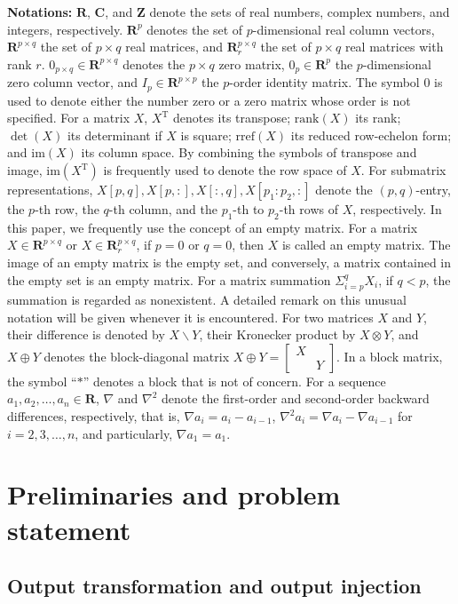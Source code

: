 \documentclass[sort&compress]{elsarticle}
\newcommand\rank{\mathrm{rank}}
\newcommand\rref{\mathrm{rref}}
\newcommand\im{\mathrm{im}}
\newcommand\imr[1]{\mathrm{im}(#1^\mathrm T)}
\newcommand\R{\mathbf R}
\newcommand\T{\mathrm T}
\begin{document}
\textbf{Notations:}
$\R$, $\mathbf C$, and $\mathbf Z$ denote the sets of real numbers,
complex numbers, and integers, respectively.
$\R^p$ denotes the set of $p$-dimensional real column vectors,
$\R^{p\times q}$ the set of $p\times q$ real matrices, and
$\R^{p\times q}_r$ the set of $p\times q$ real matrices with rank $r$.
$0_{p\times q}\in\R^{p\times q}$ denotes the $p\times q$ zero matrix,
$0_p\in\R^p$ the $p$-dimensional zero column vector, and
$I_p\in\R^{p\times p}$ the $p$-order identity matrix.
The symbol $0$ is used to denote either the number zero or
a zero matrix whose order is not specified.
For a matrix $X$,
$X^\T$ denotes its transpose;
$\rank(X)$ its rank;
$\det(X)$ its determinant if $X$ is square;
$\rref(X)$ its reduced row-echelon form;
and $\im(X)$ its column space.
By combining the symbols of transpose and image,
$\imr X$ is frequently used to denote the row space of $X$.
For submatrix representations,
$X[p,q],X[p,:],X[:,q],X[p_1\!:\!p_2,:]$ denote the $(p,q)$-entry,
the $p$-th row, the $q$-th column, and
the $p_1$-th to $p_2$-th rows of $X$, respectively.
In this paper, we frequently use the concept of an empty matrix.
For a matrix $X\in\R^{p\times q}$ or $X\in\R^{p\times q}_r$,
if $p=0$ or $q=0$, then $X$ is called an empty matrix.
The image of an empty matrix is the empty set, and conversely,
a matrix contained in the empty set is an empty matrix.
For a matrix summation $\Sigma_{i=p}^qX_i$,
if $q<p$, the summation is regarded as nonexistent.
A detailed remark on this unusual notation will be given
whenever it is encountered.
For two matrices $X$ and $Y$,
their difference is denoted by $X\backslash Y$,
their Kronecker product by $X\otimes Y$, and
$X\oplus Y$ denotes the block-diagonal matrix
$X\oplus Y=\begin{bmatrix}X&\\ &Y\end{bmatrix}$.
In a block matrix, the symbol ``$*$'' denotes a block that is not of concern.
For a sequence $a_1,a_2,\dots,a_n\in\R$,
$\nabla$ and $\nabla^2$ denote the first-order and second-order
backward differences, respectively, that is,
$\nabla a_i=a_i-a_{i-1}$,
$\nabla^2a_i=\nabla a_i-\nabla a_{i-1}$ for
$i=2,3,\dots,n$, and particularly, $\nabla a_1=a_1$.

\section{Preliminaries and problem statement}

\subsection{Output transformation and output injection}
\end{document}
